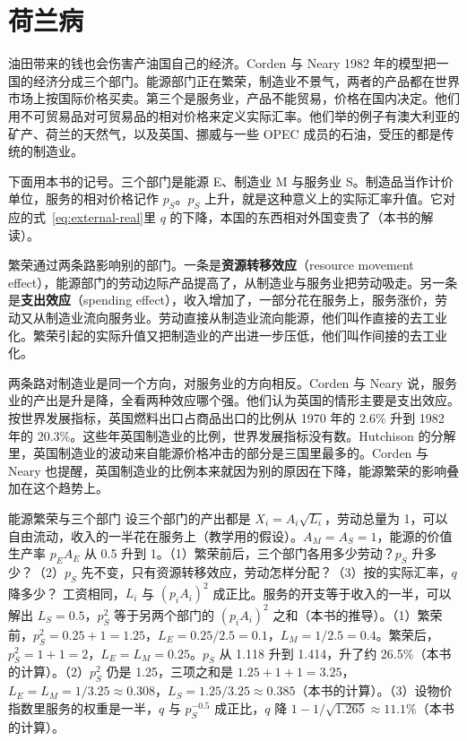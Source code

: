 \section{荷兰病}\label{sec:oil-dutch}

油田带来的钱也会伤害产油国自己的经济。Corden 与 Neary 1982 年的模型把一国的经济分成三个部门\cite{cordenneary1982}。能源部门正在繁荣，制造业不景气，两者的产品都在世界市场上按国际价格买卖。第三个是服务业，产品不能贸易，价格在国内决定\cite{cordenneary1982}。他们用不可贸易品对可贸易品的相对价格来定义实际汇率\cite{cordenneary1982}。他们举的例子有澳大利亚的矿产、荷兰的天然气，以及英国、挪威与一些 OPEC 成员的石油，受压的都是传统的制造业\cite{cordenneary1982}。

下面用本书的记号。三个部门是能源 E、制造业 M 与服务业 S。制造品当作计价单位，服务的相对价格记作 $p_S$。$p_S$ 上升，就是这种意义上的实际汇率升值。它对应的式~\eqref{eq:external-real}里 $q$ 的下降，本国的东西相对外国变贵了（本书的解读）。

繁荣通过两条路影响别的部门\cite{cordenneary1982}。一条是\textbf{资源转移效应}（resource movement effect），能源部门的劳动边际产品提高了，从制造业与服务业把劳动吸走\cite{cordenneary1982}。另一条是\textbf{支出效应}（spending effect），收入增加了，一部分花在服务上，服务涨价，劳动又从制造业流向服务业\cite{cordenneary1982}。劳动直接从制造业流向能源，他们叫作直接的去工业化\cite{cordenneary1982}。繁荣引起的实际升值又把制造业的产出进一步压低，他们叫作间接的去工业化\cite{cordenneary1982}。

两条路对制造业是同一个方向，对服务业的方向相反。Corden 与 Neary 说，服务业的产出是升是降，全看两种效应哪个强\cite{cordenneary1982}。他们认为英国的情形主要是支出效应\cite{cordenneary1982}。按世界发展指标，英国燃料出口占商品出口的比例从 1970 年的 2.6\% 升到 1982 年的 20.3\%\cite{wdi47}。这些年英国制造业的比例，世界发展指标没有数。Hutchison 的分解里，英国制造业的波动来自能源价格冲击的部分是三国里最多的\cite{hutchison1990}。Corden 与 Neary 也提醒，英国制造业的比例本来就因为别的原因在下降，能源繁荣的影响叠加在这个趋势上\cite{cordenneary1982}。

\begin{example}{能源繁荣与三个部门}\label{ex:oil-dutch}
设三个部门的产出都是 $X_i=A_i\sqrt{L_i}$，劳动总量为 1，可以自由流动，收入的一半花在服务上（教学用的假设）。$A_M=A_S=1$，能源的价值生产率 $p_EA_E$ 从 0.5 升到 1。（1）繁荣前后，三个部门各用多少劳动？$p_S$ 升多少？（2）$p_S$ 先不变，只有资源转移效应，劳动怎样分配？（3）按的实际汇率，$q$ 降多少？
\solution
工资相同，$L_i$ 与 $(p_iA_i)^{2}$ 成正比。服务的开支等于收入的一半，可以解出 $L_S=0.5$，$p_S^{2}$ 等于另两个部门的 $(p_iA_i)^{2}$ 之和（本书的推导）。（1）繁荣前，$p_S^{2}=0.25+1=1.25$，$L_E=0.25/2.5=0.1$，$L_M=1/2.5=0.4$。繁荣后，$p_S^{2}=1+1=2$，$L_E=L_M=0.25$。$p_S$ 从 1.118 升到 1.414，升了约 26.5\%（本书的计算）。（2）$p_S^{2}$ 仍是 1.25，三项之和是 $1.25+1+1=3.25$，$L_E=L_M=1/3.25\approx0.308$，$L_S=1.25/3.25\approx0.385$（本书的计算）。（3）设物价指数里服务的权重是一半，$q$ 与 $p_S^{-0.5}$ 成正比，$q$ 降 $1-1/\sqrt{1.265}\approx11.1\%$（本书的计算）。
\end{example}

